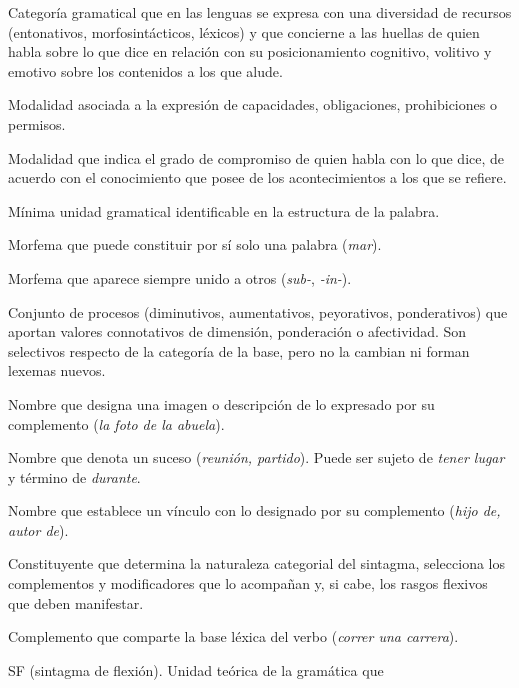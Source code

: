 \begin{glosariogeneral}
  \item[Modalidad:] Categoría gramatical que en las lenguas se expresa con una
        diversidad de recursos (entonativos, morfosintácticos, léxicos) y que
        concierne a las huellas de quien habla sobre lo que dice en relación con
        su posicionamiento cognitivo, volitivo y emotivo sobre los contenidos a
        los que alude.
  \item[Modalidad deóntica:] Modalidad asociada a la expresión de capacidades,
        obligaciones, prohibiciones o permisos.
  \item[Modalidad epistémica:] Modalidad que indica el grado de compromiso de
        quien habla con lo que dice, de acuerdo con el conocimiento que posee de
        los acontecimientos a los que se refiere.
  \item[Morfema:] Mínima unidad gramatical identificable en la estructura de la
        palabra.
  \item[Morfema libre:] Morfema que puede constituir por sí solo una palabra
        (\textit{mar}).
  \item[Morfema ligado:] Morfema que aparece siempre unido a otros
        (\textit{sub-}, \textit{-in-}).
  \item[Morfología apreciativa:] Conjunto de procesos (diminutivos,
        aumentativos, peyorativos, ponderativos) que aportan valores
        connotativos de dimensión, ponderación o afectividad. Son selectivos
        respecto de la categoría de la base, pero no la cambian ni forman
        lexemas nuevos.
  \item[Nombre de representación:] Nombre que designa una imagen o
        descripción de lo expresado por su complemento (\textit{la foto de la
        abuela}).
  \item[Nombre eventivo:] Nombre que denota un suceso (\textit{reunión,
        partido}). Puede ser sujeto de \textit{tener lugar} y término de
        \textit{durante}.
  \item[Nombre relacional:] Nombre que establece un vínculo con lo designado
        por su complemento (\textit{hijo de, autor de}).
  \item[Núcleo:] Constituyente que determina la naturaleza categorial del
        sintagma, selecciona los complementos y modificadores que lo acompañan
        y, si cabe, los rasgos flexivos que deben manifestar.
  \item[Objeto cognado:] Complemento que comparte la base léxica del verbo
        (\textit{correr una carrera}).
  \item[Oración:] SF (sintagma de flexión). Unidad teórica de la gramática que

\end{glosariogeneral}
